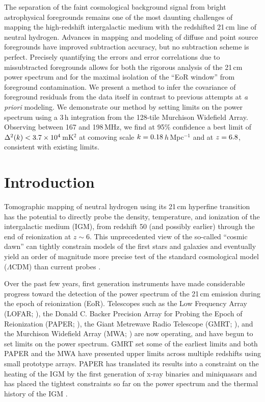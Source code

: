 The separation of the faint cosmological background signal from bright astrophysical foregrounds remains one of the most daunting challenges of mapping the high-redshift intergalactic medium with the redshifted 21\,cm line of neutral hydrogen. Advances in mapping and modeling of diffuse and point source foregrounds have improved subtraction accuracy, but no subtraction scheme is perfect.  Precisely quantifying the errors and error correlations due to missubtracted foregrounds allows for both the rigorous analysis of the 21\,cm power spectrum and for the maximal isolation of the ``EoR window'' from foreground contamination. We present a method to infer the covariance of foreground residuals from the data itself in contrast to previous attempts at \textit{a priori} modeling. We demonstrate our method by setting limits on the power spectrum using a 3\,h integration from the 128-tile Murchison Widefield Array. Observing between 167 and 198\,MHz, we find at 95\% confidence a best limit of $\Delta^2(k) < 3.7\times 10^4$\,mK$^2$ at comoving scale $k = 0.18$\,$h$\,Mpc$^{-1}$ and at $z = 6.8$, consistent with existing limits.


\section{Introduction} \label{sec:intro}

Tomographic mapping of neutral hydrogen using its 21\,cm hyperfine transition has the potential to directly probe the density, temperature, and ionization of the intergalactic medium (IGM), from redshift 50 (and possibly earlier) through the end of reionization at $z\sim 6$. This unprecedented view of the so-called ``cosmic dawn'' can tightly constrain models of the first stars and galaxies \citep{FurlanettoReview, miguelreview, PritchardLoebReview, aviBook} and eventually yield an order of magnitude more precise test of the standard cosmological model ($\Lambda$CDM) than current probes \citep{mao08}. 

Over the past few years, first generation instruments have made considerable progress toward the detection of the power spectrum of the 21\,cm emission during the epoch of reionization (EoR). Telescopes such as the Low Frequency Array (LOFAR; \citet{LOFARinstrument}), the Donald C. Backer Precision Array for Probing the Epoch of Reionization (PAPER; \citet{parsons14}), the Giant Metrewave Radio Telescope (GMRT; \citet{gmrtsignalloss}), and the Murchison Widefield Array (MWA; \citet{lonsdale09,tingay13,mwascience}) are now operating, and have begun to set limits on the power spectrum. GMRT set some of the earliest limits \citep{gmrtsignalloss} and both PAPER \citep{DannyMultiRedshift} and the MWA \citep{X13} have presented upper limits across multiple redshifts using small prototype arrays. PAPER has translated its results into a constraint on the heating of the IGM by the first generation of x-ray binaries and miniquasars \citep{parsons14} and has placed the tightest constraints so far on the power spectrum \citep{ali15} and the thermal history of the IGM \citep{PoberPAPER64Heating}.

